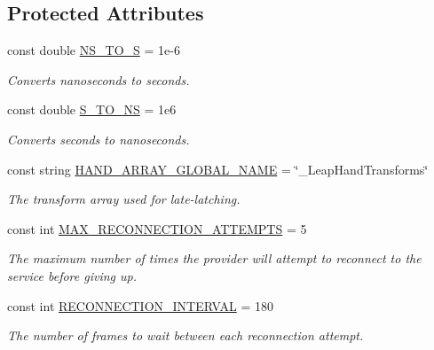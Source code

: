 \subsection*{Protected Attributes}
\begin{DoxyCompactItemize}
\item 
const double \mbox{\hyperlink{class_leap_1_1_unity_1_1_leap_service_provider_aa3d28ca766e114835e7571397a97c865}{N\+S\+\_\+\+T\+O\+\_\+S}} = 1e-\/6
\begin{DoxyCompactList}\small\item\em Converts nanoseconds to seconds. \end{DoxyCompactList}\item 
const double \mbox{\hyperlink{class_leap_1_1_unity_1_1_leap_service_provider_a0baaa02c5e7d4a148ec737876b7b388b}{S\+\_\+\+T\+O\+\_\+\+NS}} = 1e6
\begin{DoxyCompactList}\small\item\em Converts seconds to nanoseconds. \end{DoxyCompactList}\item 
const string \mbox{\hyperlink{class_leap_1_1_unity_1_1_leap_service_provider_ad8198649c99ee41eaba597cae378815b}{H\+A\+N\+D\+\_\+\+A\+R\+R\+A\+Y\+\_\+\+G\+L\+O\+B\+A\+L\+\_\+\+N\+A\+ME}} = \char`\"{}\+\_\+\+Leap\+Hand\+Transforms\char`\"{}
\begin{DoxyCompactList}\small\item\em The transform array used for late-\/latching. \end{DoxyCompactList}\item 
const int \mbox{\hyperlink{class_leap_1_1_unity_1_1_leap_service_provider_afadff6ce55b5f50f4f0b28fbe0b1fa1d}{M\+A\+X\+\_\+\+R\+E\+C\+O\+N\+N\+E\+C\+T\+I\+O\+N\+\_\+\+A\+T\+T\+E\+M\+P\+TS}} = 5
\begin{DoxyCompactList}\small\item\em The maximum number of times the provider will attempt to reconnect to the service before giving up. \end{DoxyCompactList}\item 
const int \mbox{\hyperlink{class_leap_1_1_unity_1_1_leap_service_provider_a4ecb0067ea35eec0a76e7f839547e9b0}{R\+E\+C\+O\+N\+N\+E\+C\+T\+I\+O\+N\+\_\+\+I\+N\+T\+E\+R\+V\+AL}} = 180
\begin{DoxyCompactList}\small\item\em The number of frames to wait between each reconnection attempt. \end{DoxyCompactList}\item 

\end{DoxyCompactItemize}
